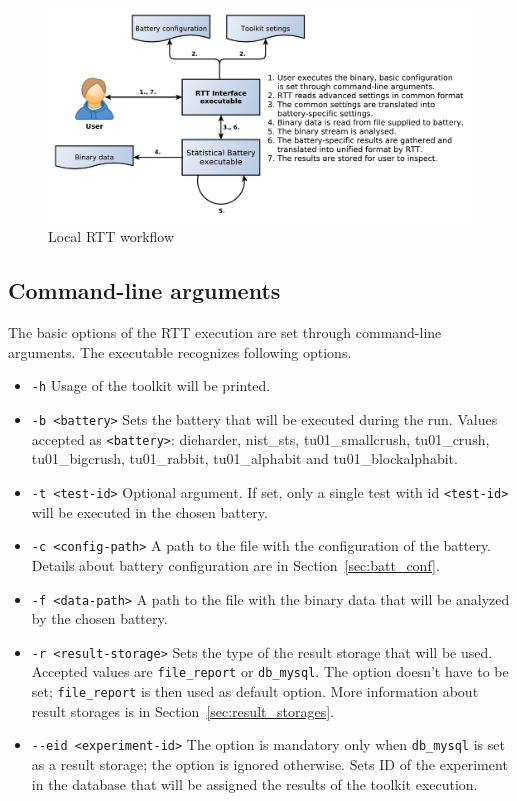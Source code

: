 \documentclass[
	digital,    %
	oneside,
	color,
	11pt,
	nocover,
	notable,
	nolof,
	nolot,
]{fithesis3}
\theoremstyle{definition}
\theoremstyle{remark}
\begin{document}
\begin{figure}[h!]
\begin{nomar}
\centering
\includegraphics[width=\paperwidth-4cm]{figures/local-rtt-workflow.pdf}
\end{nomar}
\caption{Local RTT workflow}
\label{fig:rtt_local_workflow}
\end{figure}

\pagebreak
\subsection{Command-line arguments}
The basic options of the RTT execution are set through command-line arguments. The executable recognizes following options.

\begin{itemize}
\item \texttt{-h} Usage of the toolkit will be printed.
\item \texttt{-b <battery>} Sets the battery that will be executed during the run. Values accepted as \texttt{<battery>}: dieharder, nist\_sts, tu01\_smallcrush, tu01\_crush, tu01\_bigcrush, \linebreak tu01\_rabbit, tu01\_alphabit and tu01\_blockalphabit.
\item \texttt{-t <test-id>} Optional argument. If set, only a single test with id \texttt{<test-id>} will be executed in the chosen battery.
\item \texttt{-c <config-path>} A path to the file with the configuration of the battery. Details about battery configuration are in Section~\ref{sec:batt_conf}.
\item \texttt{-f <data-path>} A path to the file with the binary data that will be analyzed by the chosen battery.
\item \texttt{-r <result-storage>} Sets the type of the result storage that will be used. Accepted values are \texttt{file\_report} or \texttt{db\_mysql}. The option doesn't have to be set; \texttt{file\_report} is then used as default option. More information about result storages is in Section~\ref{sec:result_storages}.
\item \texttt{-{}-eid <experiment-id>} The option is mandatory only when \texttt{db\_mysql} is set as a result storage; the option is ignored otherwise. Sets ID of the experiment in the database that will be assigned the results of the toolkit execution.
\end{itemize}
\end{document}
